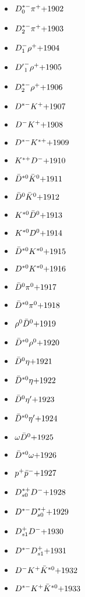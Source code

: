 \begin{multicols}{3}
\begin{itemize}
 \item $ D_{0}^{*-} \pi^{+} \hfill{+1902}$
 \item $ D_{2}^{*-} \pi^{+} \hfill{+1903}$
 \item $ D_{1}^{-} \rho^{+} \hfill{+1904}$
 \item $ {D^{\prime}}_{1}^{-} \rho^{+} \hfill{+1905}$
 \item $ D_{2}^{*-} \rho^{+} \hfill{+1906}$
 \item $ D^{*-} K^{+} \hfill{+1907}$
 \item $ D^{-} K^{+} \hfill{+1908}$
 \item $ D^{*-} K^{*+} \hfill{+1909}$
 \item $ K^{*+} D^{-} \hfill{+1910}$
 \item $ \bar{D}^{*0} \bar{K}^{0} \hfill{+1911}$
 \item $ \bar{D}^{0} \bar{K}^{0} \hfill{+1912}$
 \item $ K^{*0} \bar{D}^{0} \hfill{+1913}$
 \item $ K^{*0} D^{0} \hfill{+1914}$
 \item $ \bar{D}^{*0} K^{*0} \hfill{+1915}$
 \item $ D^{*0} K^{*0} \hfill{+1916}$
 \item $ \bar{D}^{0} \pi^{0} \hfill{+1917}$
 \item $ \bar{D}^{*0} \pi^{0} \hfill{+1918}$
 \item $ \rho^{0} \bar{D}^{0} \hfill{+1919}$
 \item $ \bar{D}^{*0} \rho^{0} \hfill{+1920}$
 \item $ \bar{D}^{0} \eta \hfill{+1921}$
 \item $ \bar{D}^{*0} \eta \hfill{+1922}$
 \item $ \bar{D}^{0} {\eta^{\prime}} \hfill{+1923}$
 \item $ \bar{D}^{*0} {\eta^{\prime}} \hfill{+1924}$
 \item $ \omega \bar{D}^{0} \hfill{+1925}$
 \item $ \bar{D}^{*0} \omega \hfill{+1926}$
 \item $ p^{+} \bar{p}^{-} \hfill{+1927}$
 \item $ D_{s0}^{*+} D^{-} \hfill{+1928}$
 \item $ D^{*-} D_{s0}^{*+} \hfill{+1929}$
 \item $ D_{s1}^{+} D^{-} \hfill{+1930}$
 \item $ D^{*-} D_{s1}^{+} \hfill{+1931}$
 \item $ D^{-} K^{+} \bar{K}^{*0} \hfill{+1932}$
 \item $ D^{*-} K^{+} \bar{K}^{*0} \hfill{+1933}$

\end{itemize}
\end{multicols}
